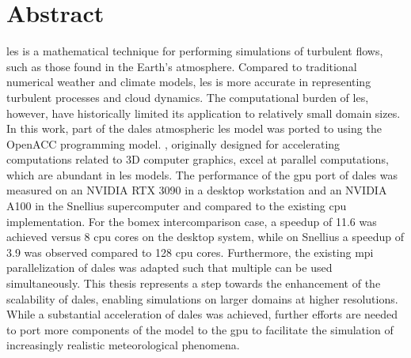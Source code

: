 \chapter*{Abstract}

\acrfull{les} is a mathematical technique for performing simulations of turbulent flows, such as those found in the Earth's atmosphere. Compared to traditional numerical weather and climate models, \acrshort{les} is more accurate in representing turbulent processes and cloud dynamics. The computational burden of \acrshort{les}, however, have historically limited its application to relatively small domain sizes. In this work, part of the \acrshort{dales} atmospheric \acrshort{les} model was ported to  using the OpenACC programming model. , originally designed for accelerating computations related to 3D computer graphics, excel at parallel computations, which are abundant in \acrshort{les} models. The performance of the \acrshort{gpu} port of \acrshort{dales} was measured on an NVIDIA RTX 3090 in a desktop workstation and an NVIDIA A100 in the Snellius supercomputer and compared to the existing \acrshort{cpu} implementation. For the \acrshort{bomex} intercomparison case, a speedup of 11.6 was achieved versus 8 \acrshort{cpu} cores on the desktop system, while on Snellius a speedup of 3.9 was observed compared to 128 \acrshort{cpu} cores. Furthermore, the existing \acrshort{mpi} parallelization of \acrshort{dales} was adapted such that multiple  can be used simultaneously. This thesis represents a step towards the enhancement of the scalability of \acrshort{dales}, enabling simulations on larger domains at higher resolutions. While a substantial acceleration of \acrshort{dales} was achieved, further efforts are needed to port more components of the model to the \acrshort{gpu} to facilitate the simulation of increasingly realistic meteorological phenomena.